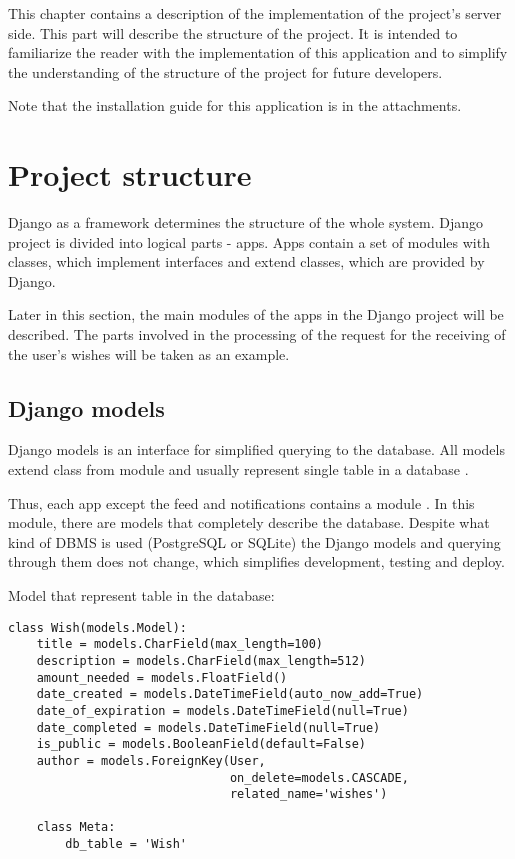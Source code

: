 This chapter contains a description of the implementation of the project's server side. This part will describe the structure of the project. It is intended to familiarize the reader with the implementation of this application and to simplify the understanding of the structure of the project for future developers.

Note that the installation guide for this application is in the attachments.


\newcommand{\appitem}[1]{
\item\textbf{#1}.
}
\newcommand{\setitem}[1]{
\item\textbf{#1}.
}
\section{Project structure}
Django as a framework determines the structure of the whole system. Django project is divided into logical parts - apps. Apps contain a set of modules with classes, which implement interfaces and extend classes, which are provided by Django.

Later in this section, the main modules of the apps in the Django project will be described. The parts involved in the processing of the request for the receiving of the user's wishes will be taken as an example.

\subsection{Django models}
Django models is an interface for simplified querying to the database. All models extend class  from  module and usually represent single table in a database \cite{djangodocs}.

Thus, each app except the feed and notifications contains a module . In this module, there are models that completely describe the database. Despite what kind of DBMS is used (PostgreSQL or SQLite) the Django models and querying through them does not change, which simplifies development, testing and deploy.

Model that represent table  in the database:
\begin{lstlisting}
class Wish(models.Model):
    title = models.CharField(max_length=100)
    description = models.CharField(max_length=512)
    amount_needed = models.FloatField()
    date_created = models.DateTimeField(auto_now_add=True)
    date_of_expiration = models.DateTimeField(null=True)
    date_completed = models.DateTimeField(null=True)
    is_public = models.BooleanField(default=False)
    author = models.ForeignKey(User,
                               on_delete=models.CASCADE,
                               related_name='wishes')

    class Meta:
        db_table = 'Wish'

\end{lstlisting}

